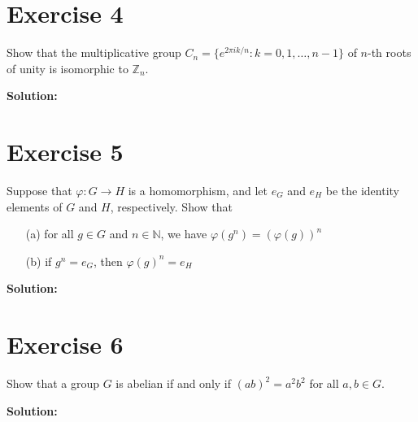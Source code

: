 \documentclass{article}
\begin{document}
\newpage

\section*{Exercise 4}
Show that the multiplicative group $C_n = \{e^{2\pi i k/n} : k = 0,1,\ldots,n-1\}$ of $n$-th roots of unity is isomorphic to $\mathbb{Z}_n$.

\textbf{Solution:}
\newpage

\section*{Exercise 5}
Suppose that $\varphi: G \to H$ is a homomorphism, and let $e_G$ and $e_H$ be the identity elements of $G$ and $H$, respectively. Show that
\begin{itemize}
\item[(a)] for all $g \in G$ and $n \in \mathbb{N}$, we have $\varphi(g^n) = (\varphi(g))^n$
\item[(b)] if $g^n = e_G$, then $\varphi(g)^n = e_H$
\end{itemize}

\textbf{Solution:}
\newpage

\section*{Exercise 6}
Show that a group $G$ is abelian if and only if $(ab)^2 = a^2b^2$ for all $a,b \in G$.

\textbf{Solution:}
\end{document}
